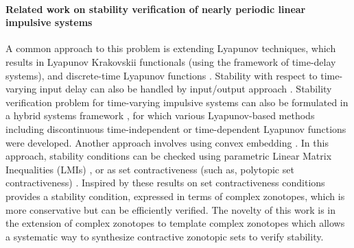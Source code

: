 
\paragraph*{Related work on stability verification of nearly periodic linear impulsive systems} 



A common approach to this problem is extending Lyapunov techniques, which results in Lyapunov Krakovskii functionals 
\cite{Mikheev1988,Teel1998} (using the framework of time-delay systems), and discrete-time Lyapunov functions \cite{2012-seuret-novel}. Stability with respect to time-varying input delay can also be handled by input/output approach 
\cite{DBLP:conf/amcc/KaoW14}. Stability verification problem for time-varying impulsive systems can also be formulated in a hybrid systems framework \cite{nevsic2004framework,Goebel2009,BauLoo_NECSYS12a}, for which various Lyapunov-based 
methods including discontinuous time-independent \cite{2008-naghshtabrizi-exponential} 
or time-dependent Lyapunov functions \cite{2010-fridman-refined} were developed. Another approach involves using convex embedding \cite{HetelDaafouz2006,Fujioka2009,2013hetel}. In this approach, stability conditions can be checked using parametric Linear Matrix Inequalities (LMIs) \cite{HetelDaafouz2006}, 
or as set contractiveness (such as, polytopic set contractiveness) \cite{2014-fiacchini-set,2013-briat-convex,AlKhatib2015}. Inspired by these results on 
set contractiveness conditions~\cite{arvind2016lis} provides a stability condition, expressed in terms of complex zonotopes, which is more conservative but can be efficiently verified. The novelty of this work is in the extension of complex zonotopes to template complex zonotopes which allows a systematic way to synthesize contractive zonotopic sets to verify stability. 


